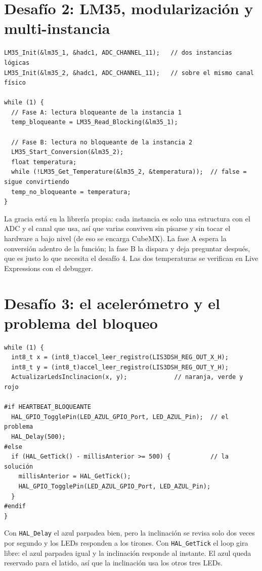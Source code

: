 \documentclass[11pt,a4paper]{article}
\begin{document}
\section*{Desafío 2: LM35, modularización y multi-instancia}

\begin{lstlisting}
LM35_Init(&lm35_1, &hadc1, ADC_CHANNEL_11);   // dos instancias lógicas
LM35_Init(&lm35_2, &hadc1, ADC_CHANNEL_11);   // sobre el mismo canal físico

while (1) {
  // Fase A: lectura bloqueante de la instancia 1
  temp_bloqueante = LM35_Read_Blocking(&lm35_1);

  // Fase B: lectura no bloqueante de la instancia 2
  LM35_Start_Conversion(&lm35_2);
  float temperatura;
  while (!LM35_Get_Temperature(&lm35_2, &temperatura));  // false = sigue convirtiendo
  temp_no_bloqueante = temperatura;
}
\end{lstlisting}

La gracia está en la librería propia: cada instancia es solo una estructura con el ADC y el canal
que usa, así que varias conviven sin pisarse y sin tocar el hardware a bajo nivel (de eso se
encarga CubeMX). La fase A espera la conversión adentro de la función; la fase B la dispara y
deja preguntar después, que es justo lo que necesita el desafío 4. Las dos temperaturas se
verifican en Live Expressions con el debugger.

\section*{Desafío 3: el acelerómetro y el problema del bloqueo}

\begin{lstlisting}
while (1) {
  int8_t x = (int8_t)accel_leer_registro(LIS3DSH_REG_OUT_X_H);
  int8_t y = (int8_t)accel_leer_registro(LIS3DSH_REG_OUT_Y_H);
  ActualizarLedsInclinacion(x, y);             // naranja, verde y rojo

#if HEARTBEAT_BLOQUEANTE
  HAL_GPIO_TogglePin(LED_AZUL_GPIO_Port, LED_AZUL_Pin);  // el problema
  HAL_Delay(500);
#else
  if (HAL_GetTick() - millisAnterior >= 500) {           // la solución
    millisAnterior = HAL_GetTick();
    HAL_GPIO_TogglePin(LED_AZUL_GPIO_Port, LED_AZUL_Pin);
  }
#endif
}
\end{lstlisting}

Con \texttt{HAL\_Delay} el azul parpadea bien, pero la inclinación se revisa solo dos veces por
segundo y los LEDs responden a los tirones. Con \texttt{HAL\_GetTick} el loop gira libre: el azul
parpadea igual y la inclinación responde al instante. El azul queda reservado para el latido, así
que la inclinación usa los otros tres LEDs.
\end{document}
